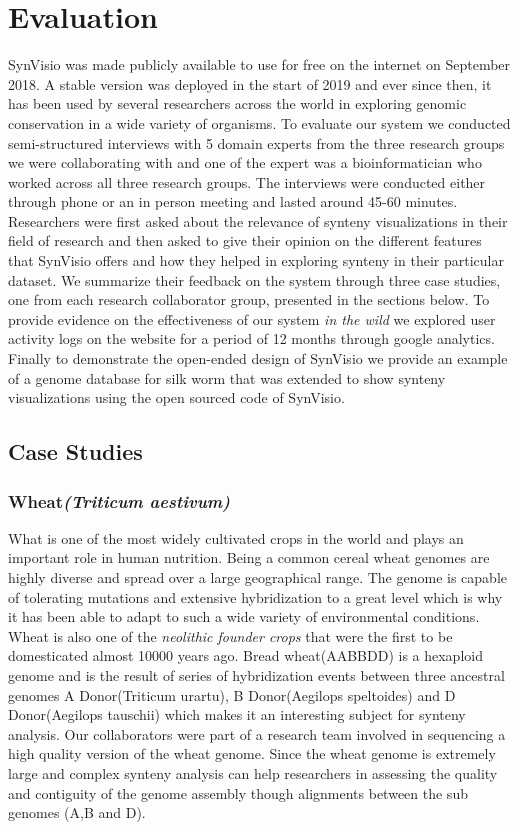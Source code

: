 \chapter{Evaluation}

SynVisio was made publicly available to use for free on the internet on September 2018. A stable version was deployed in the start of 2019 and ever since then, it has been used by several researchers across the world in exploring genomic conservation in a wide variety of organisms. To evaluate our system we conducted semi-structured interviews with 5 domain experts from the three research groups we were collaborating with and one of the expert was a bioinformatician who worked across all three research groups. The interviews were conducted either through phone or an in person meeting and lasted around 45-60 minutes. Researchers were first asked about the relevance of synteny visualizations in their field of research and then asked to give their opinion on the different features that SynVisio offers and how they helped in exploring synteny in their particular dataset. We summarize their feedback on the system through three case studies, one from each research collaborator group, presented in the sections below. To provide evidence on the effectiveness of our system \textit{in the wild} we explored user activity logs on the website for a period of 12 months through google analytics. Finally to demonstrate the open-ended design of SynVisio we provide an example of a genome database for silk worm that was extended to show synteny visualizations using the open sourced code of SynVisio.

\section{Case Studies}

\subsection{Wheat\textit{(Triticum aestivum)}}
What is one of the most widely cultivated crops in the world and plays an important role in human nutrition. Being a common cereal wheat genomes are highly diverse and spread over a large geographical range. The genome is capable of tolerating mutations and extensive hybridization to a great level which is why it has been able to adapt to such a wide variety of environmental conditions\cite{wheatinfo,10wheat}. Wheat is also one of the \textit{neolithic founder crops} that were the first to be domesticated almost 10000 years ago.
Bread wheat(AABBDD) is a hexaploid genome and is the result of series of hybridization events between three ancestral genomes A Donor(Triticum urartu), B Donor(Aegilops speltoides) and D Donor(Aegilops tauschii) which makes it an interesting subject for synteny analysis. Our collaborators were part of a research team involved in sequencing a high quality version of the wheat genome. Since the wheat genome is extremely large and complex synteny analysis can help researchers in assessing the quality and contiguity of the genome assembly though alignments between the sub genomes (A,B and D).

